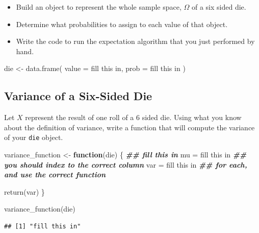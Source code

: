 \documentclass[
]{book}
\newenvironment{Shaded}{\begin{snugshade}}{\end{snugshade}}
\newcommand{\AttributeTok}[1]{\textcolor[rgb]{0.77,0.63,0.00}{#1}}
\newcommand{\ControlFlowTok}[1]{\textcolor[rgb]{0.13,0.29,0.53}{\textbf{#1}}}
\newcommand{\DocumentationTok}[1]{\textcolor[rgb]{0.56,0.35,0.01}{\textbf{\textit{#1}}}}
\newcommand{\FunctionTok}[1]{\textcolor[rgb]{0.00,0.00,0.00}{#1}}
\newcommand{\NormalTok}[1]{#1}
\newcommand{\OtherTok}[1]{\textcolor[rgb]{0.56,0.35,0.01}{#1}}
\newcommand{\StringTok}[1]{\textcolor[rgb]{0.31,0.60,0.02}{#1}}
\providecommand{\tightlist}{%
  \setlength{\itemsep}{0pt}\setlength{\parskip}{0pt}}
\theoremstyle{definition}
\theoremstyle{definition}
\theoremstyle{definition}
\theoremstyle{definition}
\theoremstyle{remark}
\begin{document}
\begin{itemize}
\tightlist
\item
  Build an object to represent the whole sample space, \(\Omega\) of a six sided die.
\item
  Determine what probabilities to assign to each value of that object.
\item
  Write the code to run the expectation algorithm that you just performed by hand.
\end{itemize}

\begin{Shaded}
\begin{Highlighting}[]
\NormalTok{die }\OtherTok{\textless{}{-}} \FunctionTok{data.frame}\NormalTok{(}
  \AttributeTok{value =} \StringTok{\textquotesingle{}fill this in\textquotesingle{}}\NormalTok{,}
  \AttributeTok{prob  =} \StringTok{\textquotesingle{}fill this in\textquotesingle{}}
\NormalTok{)}
\end{Highlighting}
\end{Shaded}

\hypertarget{variance-of-a-six-sided-die}{%
\subsection{Variance of a Six-Sided Die}\label{variance-of-a-six-sided-die}}

Let \(X\) represent the result of one roll of a 6 sided die. Using what you know about the definition of variance, write a function that will compute the variance of your \texttt{die} object.

\begin{Shaded}
\begin{Highlighting}[]
\NormalTok{variance\_function }\OtherTok{\textless{}{-}} \ControlFlowTok{function}\NormalTok{(die) \{ }
  \DocumentationTok{\#\# fill this in}
\NormalTok{  mu }\OtherTok{=} \StringTok{\textquotesingle{}fill this in\textquotesingle{}}   \DocumentationTok{\#\# you should index to the correct column}
\NormalTok{  var }\OtherTok{=} \StringTok{\textquotesingle{}fill this in\textquotesingle{}}  \DocumentationTok{\#\# for each, and use the correct function}
  
  \FunctionTok{return}\NormalTok{(var)}
\NormalTok{\}}

\FunctionTok{variance\_function}\NormalTok{(die)}
\end{Highlighting}
\end{Shaded}

\begin{verbatim}
## [1] "fill this in"
\end{verbatim}
\end{document}
